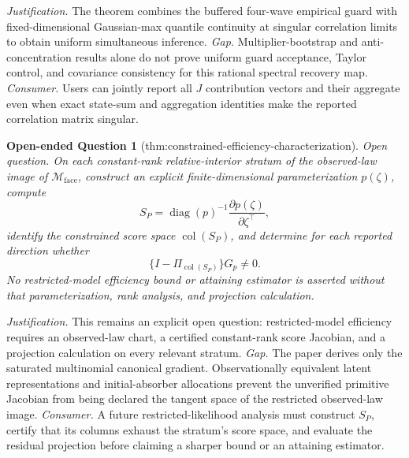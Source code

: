\documentclass{article}
\newtheorem{openendedquestion}{Open-ended Question}
\begin{document}
\par\smallskip\noindent \textit{Justification.} The theorem combines the buffered four-wave empirical guard with fixed-dimensional Gaussian-max quantile continuity at singular correlation limits to obtain uniform simultaneous inference. \textit{Gap.} Multiplier-bootstrap and anti-concentration results alone do not prove uniform guard acceptance, Taylor control, and covariance consistency for this rational spectral recovery map. \textit{Consumer.} Users can jointly report all \(J\) contribution vectors and their aggregate even when exact state-sum and aggregation identities make the reported correlation matrix singular.

\begin{openendedquestion}[thm:constrained-efficiency-characterization]\label{thm:constrained-efficiency-characterization}
Open question. On each constant-rank relative-interior stratum of the observed-law image of \(\mathcal M_{\mathrm{face}}\), construct an explicit finite-dimensional parameterization \(p(\zeta)\), compute
\[
 S_P=\operatorname{diag}(p)^{-1}\frac{\partial p(\zeta)}{\partial\zeta^\top},
\]
identify the constrained score space \(\operatorname{col}(S_P)\), and determine for each reported direction whether
\[
 \{I-\Pi_{\operatorname{col}(S_P)}\}G_p\neq0.
\]
No restricted-model efficiency bound or attaining estimator is asserted without that parameterization, rank analysis, and projection calculation.
\end{openendedquestion}
\par\smallskip\noindent \textit{Justification.} This remains an explicit open question: restricted-model efficiency requires an observed-law chart, a certified constant-rank score Jacobian, and a projection calculation on every relevant stratum. \textit{Gap.} The paper derives only the saturated multinomial canonical gradient.  Observationally equivalent latent representations and initial-absorber allocations prevent the unverified primitive Jacobian from being declared the tangent space of the restricted observed-law image. \textit{Consumer.} A future restricted-likelihood analysis must construct \(S_P\), certify that its columns exhaust the stratum's score space, and evaluate the residual projection before claiming a sharper bound or an attaining estimator.
\end{document}
